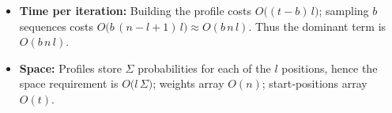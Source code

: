 \documentclass{article}
\begin{document}
\begin{itemize}
  \item \textbf{Time per iteration:}
    Building the profile costs $O\bigl((t-b)\,l\bigr)$;
    sampling $b$ sequences costs
    $O\bigl(b\,(n-l+1)\,l\bigr)\approx O(b\,n\,l)$.
    Thus the dominant term is $O(b\,n\,l)$.
  \item \textbf{Space:}
    Profiles store $\Sigma$ probabilities for each of the $l$ positions, hence the space requirement is
 $O\bigl(l\,\Sigma\bigr)$;
    weights array $O(n)$;
    start‐positions array $O(t)$.
\end{itemize}
\end{document}
